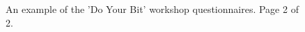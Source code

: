 \documentclass[12pt]{report} %
\begin{document}
\begin{figure}[t!]
  \ContinuedFloat
  \captionsetup{list=off, format=cont}
    \centering
\caption{An example of the 'Do Your Bit' workshop questionnaires. Page 2 of 2. } 
\label{fig:QsP2}
\end{figure}
\end{document}
